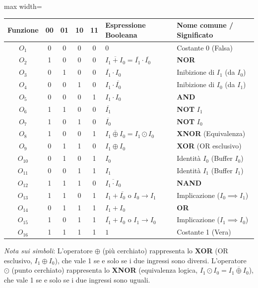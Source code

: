 \documentclass[11pt,a4paper]{report}
\newenvironment{fitcenter}{%
  \begin{center}%
  \begin{adjustbox}{max width=\linewidth}%
}{%
  \end{adjustbox}%
  \end{center}%
}
\begin{document}
\begin{fitcenter}
\small
\begin{tabular}{c|cccc|l|l}
\toprule
\textbf{Funzione} & \textbf{00} & \textbf{01} & \textbf{10} & \textbf{11} & \textbf{Espressione Booleana} & \textbf{Nome comune / Significato} \\
\midrule
$O_1$    & 0 & 0 & 0 & 0 & $0$ & Costante 0 (Falsa) \\
$O_2$    & 1 & 0 & 0 & 0 & $\overline{I_1 + I_0} = \overline{I_1} \cdot \overline{I_0}$ & \textbf{NOR} \\
$O_3$    & 0 & 1 & 0 & 0 & $\overline{I_1} \cdot I_0$ & Inibizione di $I_1$ (da $I_0$) \\
$O_4$    & 0 & 0 & 1 & 0 & $I_1 \cdot \overline{I_0}$ & Inibizione di $I_0$ (da $I_1$) \\
$O_5$    & 0 & 0 & 0 & 1 & $I_1 \cdot I_0$ & \textbf{AND} \\
$O_6$    & 1 & 1 & 0 & 0 & $\overline{I_1}$ & \textbf{NOT} $I_1$ \\
$O_7$    & 1 & 0 & 1 & 0 & $\overline{I_0}$ & \textbf{NOT} $I_0$ \\
$O_8$    & 1 & 0 & 0 & 1 & $\overline{I_1 \oplus I_0} = I_1 \odot I_0$ & \textbf{XNOR} (Equivalenza) \\
$O_9$    & 0 & 1 & 1 & 0 & $I_1 \oplus I_0$ & \textbf{XOR} (OR esclusivo) \\
$O_{10}$ & 0 & 1 & 0 & 1 & $I_0$ & Identità $I_0$ (Buffer $I_0$) \\
$O_{11}$ & 0 & 0 & 1 & 1 & $I_1$ & Identità $I_1$ (Buffer $I_1$) \\
$O_{12}$ & 1 & 1 & 1 & 0 & $\overline{I_1 \cdot I_0}$ & \textbf{NAND} \\
$O_{13}$ & 1 & 1 & 0 & 1 & $I_1 + \overline{I_0}$ o $I_0 \rightarrow I_1$ & Implicazione ($I_0 \implies I_1$) \\
$O_{14}$ & 0 & 1 & 1 & 1 & $I_1 + I_0$ & \textbf{OR} \\
$O_{15}$ & 1 & 0 & 1 & 1 & $\overline{I_1} + I_0$ o $I_1 \rightarrow I_0$ & Implicazione ($I_1 \implies I_0$) \\
$O_{16}$ & 1 & 1 & 1 & 1 & $1$ & Costante 1 (Vera) \\
\bottomrule
\end{tabular}
\end{fitcenter}

\noindent\footnotesize \textit{Nota sui simboli}: 
L'operatore $\oplus$ (più cerchiato) rappresenta lo \textbf{XOR} (OR esclusivo, $I_1 \oplus I_0$), che vale 1 se e solo se i due ingressi sono diversi. 
L'operatore $\odot$ (punto cerchiato) rappresenta lo \textbf{XNOR} (equivalenza logica, $I_1 \odot I_0 = \overline{I_1 \oplus I_0}$), che vale 1 se e solo se i due ingressi sono uguali.
\end{document}
